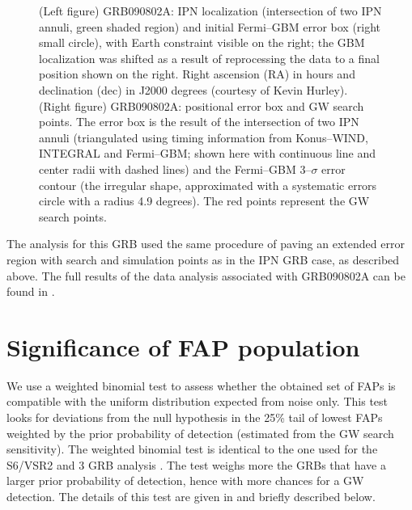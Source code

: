 \begin{figure}[ht!]
\caption{(Left figure) GRB090802A: IPN localization (intersection of two IPN annuli, green shaded region) and initial Fermi--GBM error box (right small circle), with Earth constraint visible on the right; the GBM localization was shifted as a result of reprocessing the data to a final position shown on the right. Right ascension (RA) in hours and declination (dec) in J2000 degrees (courtesy of Kevin Hurley). (Right figure) GRB090802A: positional error box and GW search points. The error box is the result of the intersection of two IPN annuli (triangulated using timing information from Konus--WIND, INTEGRAL and Fermi--GBM; shown here with continuous line and center radii with dashed lines) and the Fermi--GBM 3--$\sigma$ error contour (the irregular shape, approximated with a systematic errors circle with a radius 4.9 degrees). The red points represent the GW search points.}
\label{090802_IPN}
\end{figure}

The analysis for this GRB used the same procedure of paving an extended error region with search and simulation points as in the IPN GRB case, as described above. The full results of the data analysis associated with GRB090802A can be found in \cite{lvc:s6grb}.

\section{Significance of FAP population}
\label{sec:fappop}

We use a weighted binomial test to assess whether the obtained set of FAPs is compatible with the uniform distribution expected from noise only. This test looks for deviations from the null hypothesis in the 25\% tail of lowest FAPs weighted by the prior probability of detection (estimated from the GW search sensitivity). The weighted binomial test is identical to the one used for the S6/VSR2 and 3 GRB analysis \cite{lvc:s6grb}. The test weighs more the GRBs that have a larger prior probability of detection, hence with more chances for a GW detection. The details of this test are given in \cite{lvc:s6grb} and briefly described below.

